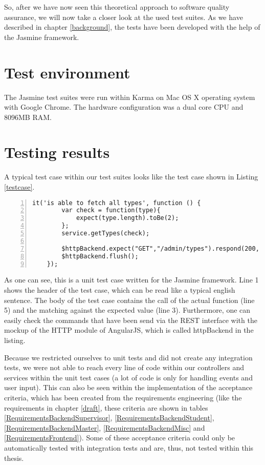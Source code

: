 So, after we have now seen this theoretical approach to software quality assurance, we will now take a closer look at the used test suites. As we have described in chapter \ref{background}, the tests have been developed with the help of the Jasmine framework.
  
\section{Test environment}
The Jasmine test suites were run within Karma on Mac OS X operating system with Google Chrome. The hardware configuration was a dual core \ac{CPU} and 8096MB \ac{RAM}.

\section{Testing results}
A typical test case within our test suites looks like the test case shown in Listing \ref{testcase}. 

\begin{lstlisting}[numbers=left,caption={Simple test case for the type service},label=testcase,frame=tlbr,breaklines]
    it('is able to fetch all types', function () {
        var check = function(type){
            expect(type.length).toBe(2);
        };
        service.getTypes(check);

        $httpBackend.expect("GET","/admin/types").respond(200, typeList);
        $httpBackend.flush();
    });
\end{lstlisting}

As one can see, this is a unit test case written for the Jasmine framework. Line 1 shows the header of the test case, which can be read like a typical english sentence. The body of the test case contains the call of the actual function (line 5) and the matching against the expected value (line 3). Furthermore, one can easily check the commands that have been send via the \ac{REST} interface with the mockup of the \ac{HTTP} module of AngularJS, which is called httpBackend in the listing.

Because we restricted ourselves to unit tests and did not create any integration tests, we were not able to reach every line of code within our controllers and services within the unit test cases (a lot of code is only for handling events and user input). This can also be seen within the implementation of the acceptance criteria, which has been created from the requirements engineering (like the requirements in chapter \ref{draft}, these criteria are shown in tables \ref{RequirementsBackendSupervisor}, \ref{RequirementsBackendStudent}, \ref{RequirementsBackendMaster}, \ref{RequirementsBackendMisc} and \ref{RequirementsFrontend}). Some of these acceptance criteria could only be automatically tested with integration tests and are, thus, not tested within this thesis. 

